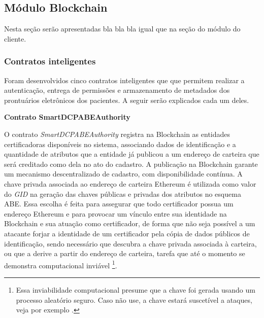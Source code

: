\documentclass[a4paper,11pt]{article}
\begin{document}
\subsection{Módulo Blockchain}

{\color{magenta}Nesta seção serão apresentadas bla bla bla igual que na seção do módulo do cliente.}

\subsubsection{Contratos inteligentes}
\label{sec:sub:ImplementacaoSmartContracts}

Foram desenvolvidos cinco contratos inteligentes que que permitem realizar a autenticação, entrega de permissões e armazenamento de metadados dos prontuários eletrônicos dos pacientes.
A seguir serão explicados cada um deles.

\textbf{Contrato SmartDCPABEAuthority}



O contrato \emph{SmartDCPABEAuthority} registra na Blockchain as entidades certificadoras disponíveis no sistema, associando dados de identificação e a quantidade de atributos que a entidade já publicou a um endereço de carteira que será creditado como dela no ato do cadastro.
A publicação na Blockchain garante um mecanismo descentralizado de cadastro, com disponibilidade contínua.
A chave privada associada ao endereço de carteira Ethereum é utilizada como valor do \emph{GID} na geração das chaves públicas e privadas dos atributos no esquema ABE.
Essa escolha é feita para assegurar que todo certificador possua um endereço Ethereum e para provocar um vínculo entre sua identidade na Blockchain e sua atuação como certificador, de forma que não seja possível a um atacante forjar a identidade de um certificador pela cópia de dados públicos de identificação, sendo necessário que descubra a chave privada associada à carteira, ou que a derive a partir do endereço de carteira, tarefa que até o momento se demonstra computacional inviável
\footnote{Essa inviabilidade computacional presume que a chave foi gerada usando um processo aleatório seguro. Caso não use, a chave estará suscetível a ataques, veja por exemplo \cite{Bednarek2019}.}.
\end{document}
